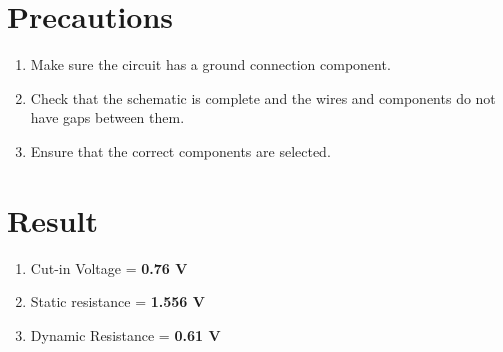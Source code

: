 \documentclass{article}
\begin{document}
	\section{Precautions}
	\begin{enumerate}
		\item Make sure the circuit has a ground connection component.
		\item Check that the schematic is complete and the wires and components do not have gaps between them.
		\item Ensure that the correct components are selected.
	\end{enumerate}

	\section{Result}
	\begin{enumerate}
		\item Cut-in Voltage =\textbf{ 0.76 V}
		\item Static resistance =\textbf{ 1.556 V}
		\item Dynamic Resistance =\textbf{ 0.61 V}
	\end{enumerate}
\end{document}
